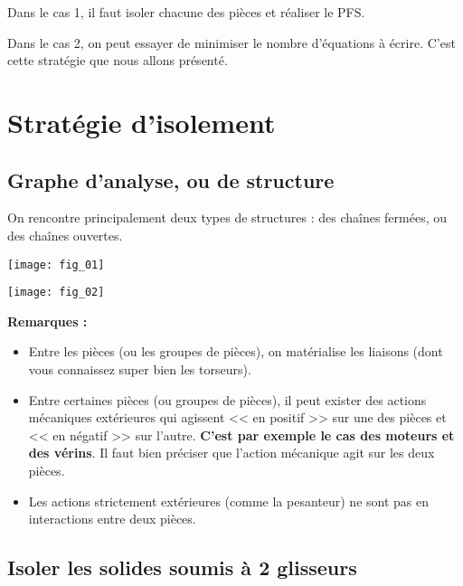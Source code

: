 Dans le cas 1, il faut isoler chacune des pièces et réaliser le PFS. 

Dans le cas 2, on peut essayer de minimiser le nombre d'équations à écrire. C'est cette stratégie que nous allons présenté.


\section{Stratégie d'isolement}

\subsection{Graphe d'analyse, ou de structure}

On rencontre principalement deux types de structures : des chaînes fermées, ou des chaînes ouvertes.

\begin{figure*}[!ht]
\begin{minipage}[c]{.4\linewidth}
\begin{center}
\texttt{[image: fig\_01]}
\end{center}
\end{minipage}
\hfill
\begin{minipage}[c]{.55\linewidth}
\begin{center}
\texttt{[image: fig\_02]}
\end{center}
\end{minipage}
\end{figure*}

\textbf{Remarques :}
\begin{itemize}
\item Entre les pièces (ou les groupes de pièces), on matérialise les liaisons (dont vous connaissez super bien les torseurs).
\item Entre certaines pièces (ou groupes de pièces), il peut exister des actions mécaniques extérieures qui agissent << en positif >> sur une des pièces et << en négatif >> sur l'autre. \textbf{C'est par exemple le cas des moteurs et des vérins}. Il faut bien préciser que l'action mécanique agit sur les deux pièces.
\item Les actions strictement extérieures (comme la pesanteur) ne sont pas en interactions entre deux pièces.
\end{itemize}


\subsection{Isoler les solides soumis à 2 glisseurs}

